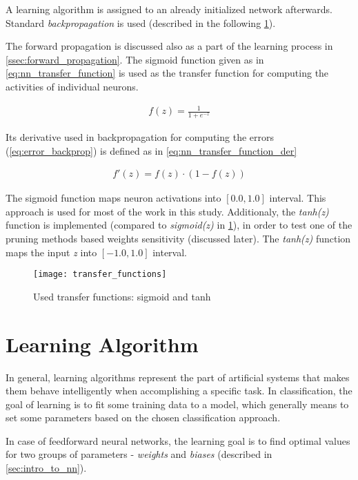 A learning algorithm is assigned to an already initialized network afterwards. Standard \textit{backpropagation} is used (described in the following \cref{sec:learning_algorithm}).

The forward propagation is discussed also as a part of the learning process in \cref{ssec:forward_propagation}. The sigmoid function given as in \cref{eq:nn_transfer_function} is used as the transfer function for computing the activities of individual neurons.

\begin{align} \label{eq:nn_transfer_function}
f(z) = \frac{1}{1 + e^{-z}}
\end{align}

Its derivative used in backpropagation for computing the errors (\cref{eq:error_backprop}) is defined as in \ref{eq:nn_transfer_function_der}

\begin{align} \label{eq:nn_transfer_function_der}
f'(z) = f(z) \cdot (1-f(z))
\end{align}

The sigmoid function maps neuron activations into $ [0.0, 1.0] $ interval. This approach is used for most of the work in this study. Additionaly, the \textit{tanh(z)} function is implemented (compared to \textit{sigmoid(z)} in \cref{img:sigmoid}), in order to test one of the pruning methods based weights sensitivity (discussed later). The \textit{tanh(z)} function maps the input \textit{z} into $ [-1.0, 1.0] $ interval.

\begin{figure}[H]
  \centering
  \texttt{[image: transfer\_functions]}
  \caption{Used transfer functions: sigmoid and tanh}
  \label{img:sigmoid}
\end{figure}

\newpage
\section{Learning Algorithm} \label{sec:learning_algorithm}
In general, learning algorithms represent the part of artificial systems that makes them behave intelligently when accomplishing a specific task. In classification, the goal of learning is to fit some training data to a model, which generally means to set some parameters based on the chosen classification approach.

In case of feedforward neural networks, the learning goal is to find optimal values for two groups of parameters - \textit{weights} and \textit{biases} (described in \cref{sec:intro_to_nn}).

